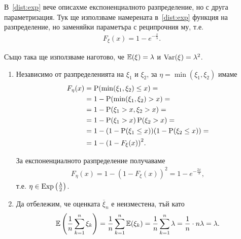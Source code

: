 \documentclass[numbers=endperiod, bibliography=totocnumbered]{scrartcl}
\begin{document}
\begin{solution}
  В~\ref{dist:exp} вече описахме експоненциалното разпределение, но с друга параметризация. Тук ще използваме намерената в~\ref{dist:exp} функция на разпределение, но заменяйки параметъра с реципрочния му, т.е.
  \begin{align*}
    F_\xi(x) = 1 - e^{-\frac x \lambda}.
  \end{align*}

  Също така ще използваме наготово, че \( \mathbb{E}(\xi) = \lambda \) и \( \operatorname{Var}(\xi) = \lambda^2 \).

  \begin{enumerate}[label=\alph*)]
    \item Независимо от разпределенията на \( \xi_1 \) и \( \xi_2 \), за \( \eta = \min(\xi_1, \xi_2) \) имаме
    \begin{align*}
      F_\eta(x)
      &=
      \operatorname{P}(\min(\xi_1, \xi_2) \leq x)
      = \\ &=
      1 - \operatorname{P}(\min(\xi_1, \xi_2) > x)
      = \\ &=
      1 - \operatorname{P}(\xi_1 > x, \xi_2 > x)
      = \\ &=
      1 - \operatorname{P}(\xi_1 > x) \operatorname{P}(\xi_2 > x)
      = \\ &=
      1 - (1 - \operatorname{P}(\xi_1 \leq x)) (1 - \operatorname{P}(\xi_2 \leq x))
      = \\ &=
      1 - {(1 - F_\xi(x))}^2.
    \end{align*}

    За експоненциалното разпределение получаваме
    \begin{align*}
      F_\eta(x)
      =
      1 - {(1 - F_\xi(x))}^2
      =
      1 - e^{- \frac {2 x} \lambda},
    \end{align*}
    т.е. \( \eta \in \operatorname{Exp}\left(\frac \lambda 2 \right) \).

    \item Да отбележим, че оценката \( \overline \xi_n \) е неизместена, тъй като
    \begin{align*}
      \mathbb{E}\left( \frac 1 n \sum_{k=1}^n \xi_k \right)
      =
      \frac 1 n \sum_{k=1}^n \mathbb{E}(\xi_k)
      =
      \frac 1 n \sum_{k=1}^n \lambda
      =
      \frac 1 n \cdot n \lambda
      =
      \lambda.
    \end{align*}


\end{enumerate}
\end{solution}
\end{document}
